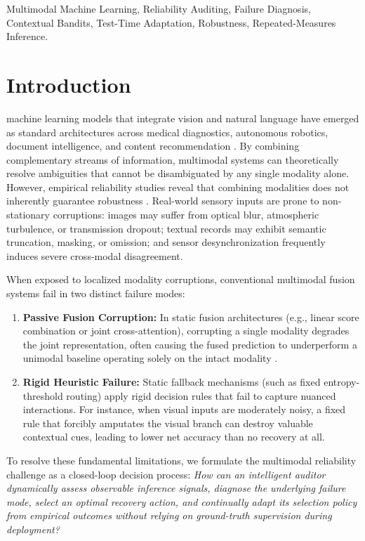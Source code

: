 \documentclass[journal]{IEEEtran}
\begin{document}
\begin{IEEEkeywords}
Multimodal Machine Learning, Reliability Auditing, Failure Diagnosis, Contextual Bandits, Test-Time Adaptation, Robustness, Repeated-Measures Inference.
\end{IEEEkeywords}

\section{Introduction}
 machine learning models that integrate vision and natural language have emerged as standard architectures across medical diagnostics, autonomous robotics, document intelligence, and content recommendation \cite{liang2022foundations}. By combining complementary streams of information, multimodal systems can theoretically resolve ambiguities that cannot be disambiguated by any single modality alone. However, empirical reliability studies reveal that combining modalities does not inherently guarantee robustness \cite{ma2022are, huang2023modality}. Real-world sensory inputs are prone to non-stationary corruptions: images may suffer from optical blur, atmospheric turbulence, or transmission dropout; textual records may exhibit semantic truncation, masking, or omission; and sensor desynchronization frequently induces severe cross-modal disagreement.

When exposed to localized modality corruptions, conventional multimodal fusion systems fail in two distinct failure modes:
\begin{enumerate}
    \item \textbf{Passive Fusion Corruption:} In static fusion architectures (e.g., linear score combination or joint cross-attention), corrupting a single modality degrades the joint representation, often causing the fused prediction to underperform a unimodal baseline operating solely on the intact modality \cite{ma2022are}.
    \item \textbf{Rigid Heuristic Failure:} Static fallback mechanisms (such as fixed entropy-threshold routing) apply rigid decision rules that fail to capture nuanced interactions. For instance, when visual inputs are moderately noisy, a fixed rule that forcibly amputates the visual branch can destroy valuable contextual cues, leading to lower net accuracy than no recovery at all.
\end{enumerate}

To resolve these fundamental limitations, we formulate the multimodal reliability challenge as a closed-loop decision process: \textit{How can an intelligent auditor dynamically assess observable inference signals, diagnose the underlying failure mode, select an optimal recovery action, and continually adapt its selection policy from empirical outcomes without relying on ground-truth supervision during deployment?}
\end{document}
